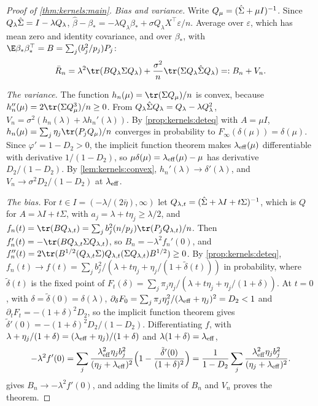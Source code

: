 \begin{refsection}
\begin{proof}[Proof of \cref{thm:kernels:main}]
\emph{Bias and variance.} Write $Q_\mu=(\hat\Sigma+\mu I)^{-1}$. Since $Q_\lambda\hat\Sigma=I-\lambda Q_\lambda$, $\hat\beta-\beta_*=-\lambda Q_\lambda\beta_*+\sigma Q_\lambda X^\top\varepsilon/n$. Average over $\varepsilon$, which has mean zero and identity covariance, and over $\beta_*$, with $\E\beta_*\beta_*^\top=B=\sum_j(b_j^2/p_j)P_j$:
\[
\bar R_n=\lambda^2\tr(BQ_\lambda\Sigma Q_\lambda)+\frac{\sigma^2}n\tr(\Sigma Q_\lambda\kernelsSh Q_\lambda)=:B_n+V_n .
\]

\emph{The variance.} The function $h_n(\mu)=\tr(\Sigma Q_\mu)/n$ is convex, because $h_n''(\mu)=2\tr(\Sigma Q_\mu^3)/n\ge0$. From $Q_\lambda\hat\Sigma Q_\lambda=Q_\lambda-\lambda Q_\lambda^2$, $V_n=\sigma^2(h_n(\lambda)+\lambda h_n'(\lambda))$. By \cref{prop:kernels:deteq} with $A=\mu I$, $h_n(\mu)=\sum_j\eta_j\tr(P_jQ_\mu)/n$ converges in probability to $F_\infty(\delta(\mu))=\delta(\mu)$. Since $\varphi'=1-D_2>0$, the implicit function theorem makes $\lambda_{\mathrm{eff}}(\mu)$ differentiable with derivative $1/(1-D_2)$, so $\mu\delta(\mu)=\lambda_{\mathrm{eff}}(\mu)-\mu$ has derivative $D_2/(1-D_2)$. By \cref{lem:kernels:convex}, $h_n'(\lambda)\to\delta'(\lambda)$, and $V_n\to\sigma^2D_2/(1-D_2)$ at $\lambda_{\mathrm{eff}}$.

\emph{The bias.} For $t\in I=(-\lambda/(2\bar\eta),\infty)$ let $Q_{\lambda,t}=(\hat\Sigma+\lambda I+t\Sigma)^{-1}$, which is $Q$ for $A=\lambda I+t\Sigma$, with $a_j=\lambda+t\eta_j\ge\lambda/2$, and $f_n(t)=\tr(BQ_{\lambda,t})=\sum_jb_j^2(n/p_j)\tr(P_jQ_{\lambda,t})/n$. Then $f_n'(t)=-\tr(BQ_{\lambda,t}\Sigma Q_{\lambda,t})$, so $B_n=-\lambda^2f_n'(0)$, and $f_n''(t)=2\tr(B^{1/2}(Q_{\lambda,t}\Sigma)Q_{\lambda,t}(\Sigma Q_{\lambda,t})B^{1/2})\ge0$. By \cref{prop:kernels:deteq}, $f_n(t)\to f(t)=\sum_jb_j^2/(\lambda+t\eta_j+\eta_j/(1+\tilde\delta(t)))$ in probability, where $\tilde\delta(t)$ is the fixed point of $F_t(\delta)=\sum_j\pi_j\eta_j/(\lambda+t\eta_j+\eta_j/(1+\delta))$. At $t=0$, with $\delta=\tilde\delta(0)=\delta(\lambda)$, $\partial_\delta F_0=\sum_j\pi_j\eta_j^2/(\lambda_{\mathrm{eff}}+\eta_j)^2=D_2<1$ and $\partial_tF_t=-(1+\delta)^2D_2$, so the implicit function theorem gives $\tilde\delta'(0)=-(1+\delta)^2D_2/(1-D_2)$. Differentiating $f$, with $\lambda+\eta_j/(1+\delta)=(\lambda_{\mathrm{eff}}+\eta_j)/(1+\delta)$ and $\lambda(1+\delta)=\lambda_{\mathrm{eff}}$,
\[
-\lambda^2f'(0)=\sum_j\frac{\lambda_{\mathrm{eff}}^2\eta_jb_j^2}{(\eta_j+\lambda_{\mathrm{eff}})^2}\Bigl(1-\frac{\tilde\delta'(0)}{(1+\delta)^2}\Bigr)=\frac1{1-D_2}\sum_j\frac{\lambda_{\mathrm{eff}}^2\eta_jb_j^2}{(\eta_j+\lambda_{\mathrm{eff}})^2}.
\]
 gives $B_n\to-\lambda^2f'(0)$, and adding the limits of $B_n$ and $V_n$ proves the theorem.
\end{proof}


\end{refsection}
